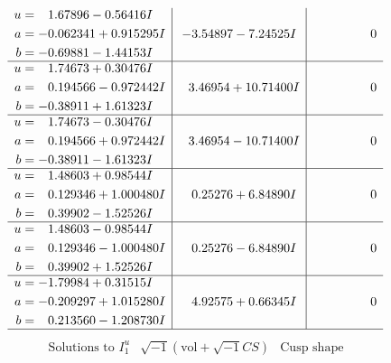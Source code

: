 \documentclass[1p]{elsarticle_modified}
\theoremstyle{definition}
\newcommand{\I}{\sqrt{-1}}
\begin{document}
$$\begin{array}{c|c|c}
\begin{aligned}
u &= \phantom{-}1.67896 - 0.56416 I \\
a &= -0.062341 + 0.915295 I \\
b &= -0.69881 - 1.44153 I\end{aligned}
 & -3.54897 - 7.24525 I & \phantom{-0.000000 } 0 \\ \hline\begin{aligned}
u &= \phantom{-}1.74673 + 0.30476 I \\
a &= \phantom{-}0.194566 - 0.972442 I \\
b &= -0.38911 + 1.61323 I\end{aligned}
 & \phantom{-}3.46954 + 10.71400 I & \phantom{-0.000000 } 0 \\ \hline\begin{aligned}
u &= \phantom{-}1.74673 - 0.30476 I \\
a &= \phantom{-}0.194566 + 0.972442 I \\
b &= -0.38911 - 1.61323 I\end{aligned}
 & \phantom{-}3.46954 - 10.71400 I & \phantom{-0.000000 } 0 \\ \hline\begin{aligned}
u &= \phantom{-}1.48603 + 0.98544 I \\
a &= \phantom{-}0.129346 + 1.000480 I \\
b &= \phantom{-}0.39902 - 1.52526 I\end{aligned}
 & \phantom{-}0.25276 + 6.84890 I & \phantom{-0.000000 } 0 \\ \hline\begin{aligned}
u &= \phantom{-}1.48603 - 0.98544 I \\
a &= \phantom{-}0.129346 - 1.000480 I \\
b &= \phantom{-}0.39902 + 1.52526 I\end{aligned}
 & \phantom{-}0.25276 - 6.84890 I & \phantom{-0.000000 } 0 \\ \hline\begin{aligned}
u &= -1.79984 + 0.31515 I \\
a &= -0.209297 + 1.015280 I \\
b &= \phantom{-}0.213560 - 1.208730 I\end{aligned}
 & \phantom{-}4.92575 + 0.66345 I & \phantom{-0.000000 } 0\\
 \hline 
 \end{array}$$\newpage$$\begin{array}{c|c|c}  
\text{Solutions to }I^u_{1}& \I (\text{vol} + \sqrt{-1}CS) & \text{Cusp shape}\\

\end{array}$$
\end{document}
